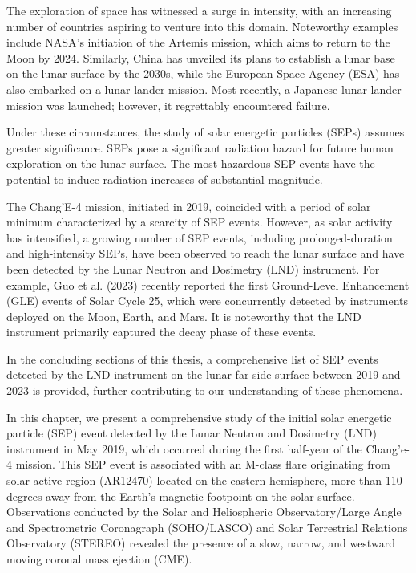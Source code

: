 
The exploration of space has witnessed a surge in intensity, with an increasing number of countries aspiring to venture into this domain. Noteworthy examples include NASA's initiation of the Artemis mission, which aims to return to the Moon by 2024. Similarly, China has unveiled its plans to establish a lunar base on the lunar surface by the 2030s, while the European Space Agency (ESA) has also embarked on a lunar lander mission. Most recently, a Japanese lunar lander mission was launched; however, it regrettably encountered failure.

Under these circumstances, the study of solar energetic particles (SEPs) assumes greater significance. SEPs pose a significant radiation hazard for future human exploration on the lunar surface. The most hazardous SEP events have the potential to induce radiation increases of substantial magnitude.

The Chang'E-4 mission, initiated in 2019, coincided with a period of solar minimum characterized by a scarcity of SEP events. However, as solar activity has intensified, a growing number of SEP events, including prolonged-duration and high-intensity SEPs, have been observed to reach the lunar surface and have been detected by the Lunar Neutron and Dosimetry (LND) instrument. For example, Guo et al. (2023) recently reported the first Ground-Level Enhancement (GLE) events of Solar Cycle 25, which were concurrently detected by instruments deployed on the Moon, Earth, and Mars. It is noteworthy that the LND instrument primarily captured the decay phase of these events.

In the concluding sections of this thesis, a comprehensive list of SEP events detected by the LND instrument on the lunar far-side surface between 2019 and 2023 is provided, further contributing to our understanding of these phenomena.


In this chapter, we present a comprehensive study of the initial solar energetic particle (SEP) event detected by the Lunar Neutron and Dosimetry (LND) instrument in May 2019, which occurred during the first half-year of the Chang'e-4 mission. This SEP event is associated with an M-class flare originating from solar active region (AR12470) located on the eastern hemisphere, more than 110 degrees away from the Earth's magnetic footpoint on the solar surface. Observations conducted by the Solar and Heliospheric Observatory/Large Angle and Spectrometric Coronagraph (SOHO/LASCO) and Solar Terrestrial Relations Observatory (STEREO) revealed the presence of a slow, narrow, and westward moving coronal mass ejection (CME).

